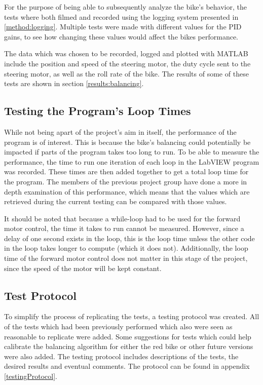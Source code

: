 For the purpose of being able to subsequently analyze the bike's behavior, the tests where both filmed and recorded using the logging system presented in \ref{method:logging}. Multiple tests were made with different values for the PID gains, to see how changing these values would affect the bikes performance. 

The data which was chosen to be recorded, logged and plotted with MATLAB include the position and speed of the steering motor, the duty cycle sent to the steering motor, as well as the roll rate of the bike. The results of some of these tests are shown in section \ref{results:balancing}.

\subsection{Testing the Program's Loop Times} \label{method:loopTimes}

While not being apart of the project's aim in itself, the performance of the program is of interest. This is because the bike's balancing could potentially be impacted if parts of the program takes too long to run. To be able to measure the performance, the time to run one iteration of each loop in the LabVIEW program was recorded. These times are then added together to get a total loop time for the program. The members of the previous project group have done a more in depth examination of this performance, which means that the values which are retrieved during the current testing can be compared with those values.

It should be noted that because a while-loop had to be used for the forward motor control, the time it takes to run cannot be measured. However, since a delay of one second exists in the loop, this is the loop time unless the other code in the loop takes longer to compute (which it does not). Additionally, the loop time of the forward motor control does not matter in this stage of the project, since the speed of the motor will be kept constant.

\subsection{Test Protocol}

To simplify the process of replicating the tests, a testing protocol was created. All of the tests which had been previously performed which also were seen as reasonable to replicate were added. Some suggestions for tests which could help calibrate the balancing algorithm for either the red bike or other future versions were also added. The testing protocol includes descriptions of the tests, the desired results and eventual comments. The protocol can be found in appendix \ref{testingProtocol}.